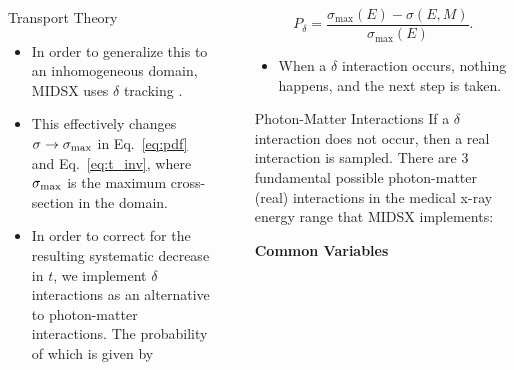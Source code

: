 \documentclass[final]{beamer}
\newlength{\sepwidth}
\newlength{\colwidth}
\newcommand{\separatorcolumn}{\begin{column}{\sepwidth}\end{column}}
\begin{document}
\begin{frame}[t]
\begin{columns}[t]
\begin{column}{\colwidth}
\begin{block}{Transport Theory}
    \begin{itemize}
      \item In order to generalize this to an inhomogeneous domain, MIDSX uses $\delta$ tracking \cite{vassiliev_monte_2017}.
      \item This effectively changes $\sigma \rightarrow \sigma_{\rm{max}}$ in Eq.~\ref{eq:pdf} and Eq.~\ref{eq:t_inv}, where $\sigma_{\rm{max}}$ is the maximum cross-section in the domain.
      \item In order to correct for the resulting systematic decrease in $t$, we implement $\delta$ interactions as an alternative to photon-matter interactions. The probability of which is given by 
    \end{itemize}  

  \end{block}
\end{column}

\separatorcolumn

\begin{column}{\colwidth}

  \begin{equation}
    P_{\delta} = \frac{\sigma_{\text{max}}(E) - \sigma(E, M)}{\sigma_{\text{max}}(E)}.
  \end{equation}

  \begin{itemize}
    \item When a $\delta$ interaction occurs, nothing happens, and the next step is taken.
  \end{itemize}  


  \begin{block}{Photon-Matter Interactions}
    If a $\delta$ interaction does not occur, then a real interaction is sampled. There are 3 fundamental possible photon-matter (real) interactions in the medical x-ray energy range that MIDSX implements:
    \vspace{-0.5\baselineskip}
    \begin{center}
      \textbf{Common Variables}
    \end{center}


\end{block}
\end{column}
\end{columns}
\end{frame}
\end{document}
